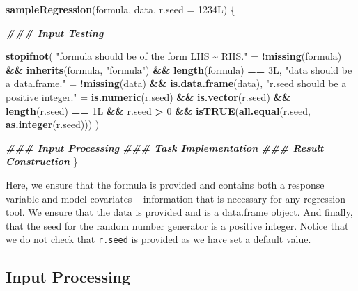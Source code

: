 \documentclass[
]{book}
\newenvironment{Shaded}{\begin{snugshade}}{\end{snugshade}}
\newcommand{\AttributeTok}[1]{\textcolor[rgb]{0.13,0.29,0.53}{#1}}
\newcommand{\DecValTok}[1]{\textcolor[rgb]{0.00,0.00,0.81}{#1}}
\newcommand{\DocumentationTok}[1]{\textcolor[rgb]{0.56,0.35,0.01}{\textbf{\textit{#1}}}}
\newcommand{\FunctionTok}[1]{\textcolor[rgb]{0.13,0.29,0.53}{\textbf{#1}}}
\newcommand{\NormalTok}[1]{#1}
\newcommand{\OtherTok}[1]{\textcolor[rgb]{0.56,0.35,0.01}{#1}}
\newcommand{\SpecialCharTok}[1]{\textcolor[rgb]{0.81,0.36,0.00}{\textbf{#1}}}
\newcommand{\StringTok}[1]{\textcolor[rgb]{0.31,0.60,0.02}{#1}}
\begin{document}
\begin{Shaded}
\begin{Highlighting}[]
\FunctionTok{sampleRegression}\NormalTok{(formula, data, }\AttributeTok{r.seed =}\NormalTok{ 1234L) \{}
  
  \DocumentationTok{\#\#\# Input Testing}
  
  \FunctionTok{stopifnot}\NormalTok{(}
    \StringTok{"\textasciigrave{}formula\textasciigrave{} should be of the form LHS \textasciitilde{} RHS."} \OtherTok{=}
      \SpecialCharTok{!}\FunctionTok{missing}\NormalTok{(formula) }\SpecialCharTok{\&\&} \FunctionTok{inherits}\NormalTok{(formula, }\StringTok{"formula"}\NormalTok{) }\SpecialCharTok{\&\&} \FunctionTok{length}\NormalTok{(formula) }\SpecialCharTok{==}\NormalTok{ 3L,}
    \StringTok{"\textasciigrave{}data\textasciigrave{} should be a data.frame."} \OtherTok{=} 
      \SpecialCharTok{!}\FunctionTok{missing}\NormalTok{(data) }\SpecialCharTok{\&\&} \FunctionTok{is.data.frame}\NormalTok{(data),}
    \StringTok{"\textasciigrave{}r.seed\textasciigrave{} should be a positive integer."} \OtherTok{=} 
      \FunctionTok{is.numeric}\NormalTok{(r.seed) }\SpecialCharTok{\&\&} \FunctionTok{is.vector}\NormalTok{(r.seed) }\SpecialCharTok{\&\&} \FunctionTok{length}\NormalTok{(r.seed) }\SpecialCharTok{==}\NormalTok{ 1L }\SpecialCharTok{\&\&} 
\NormalTok{      r.seed }\SpecialCharTok{\textgreater{}} \DecValTok{0} \SpecialCharTok{\&\&} \FunctionTok{isTRUE}\NormalTok{(}\FunctionTok{all.equal}\NormalTok{(r.seed, }\FunctionTok{as.integer}\NormalTok{(r.seed)))}
\NormalTok{  )}
  
  \DocumentationTok{\#\#\# Input Processing}
  \DocumentationTok{\#\#\# Task Implementation}
  \DocumentationTok{\#\#\# Result Construction}
\NormalTok{\}}
\end{Highlighting}
\end{Shaded}

Here, we ensure that the formula is provided and contains both a response variable and model covariates -- information that is necessary for any regression tool. We ensure that the data is provided and is a data.frame object. And finally, that the seed for the random number generator is a positive integer. Notice that we do not check that \texttt{r.seed} is provided as we have set a default value.

\hypertarget{input-processing}{%
\subsection{Input Processing}\label{input-processing}}
\end{document}
